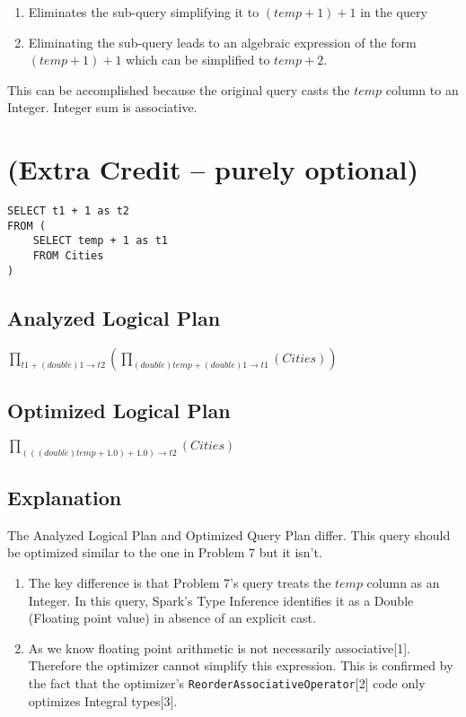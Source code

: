 \documentclass[12pt]{article}
\begin{document}
\begin{enumerate}
\item Eliminates the sub-query simplifying it to $(temp + 1) + 1$ in the query
\item Eliminating the sub-query leads to an algebraic expression of the form $(temp + 1) + 1$ which can be simplified to $temp + 2$.
\end{enumerate}

This can be accomplished because the original query casts the $temp$ column to an Integer. Integer sum is associative.
\newpage

\section{(Extra Credit -- purely optional)}
\begin{verbatim}
SELECT t1 + 1 as t2
FROM (
    SELECT temp + 1 as t1
    FROM Cities
)
\end{verbatim}

\subsection*{Analyzed Logical Plan}
$\prod_{t1 + (double)1 \rightarrow t2} ( \prod_{(double) temp + (double) 1 \rightarrow t1} (Cities) )$

\subsection*{Optimized Logical Plan}
$\prod_{(((double) temp + 1.0) + 1.0) \rightarrow t2}(Cities)$

\subsection*{Explanation}

The Analyzed Logical Plan and Optimized Query Plan differ. This query should be optimized similar to the one in Problem 7 but it isn't. 

\begin{enumerate}
\item The key difference is that Problem 7's query treats the $temp$ column as an Integer. In this query, Spark's Type Inference identifies it as a Double (Floating point value) in absence of an explicit cast.

\item As we know floating point arithmetic is not necessarily associative[1]. Therefore the optimizer cannot simplify this expression. This is confirmed by the fact that the optimizer's \texttt{ReorderAssociativeOperator}[2] code only optimizes Integral types[3].
\end{enumerate}
\end{document}
